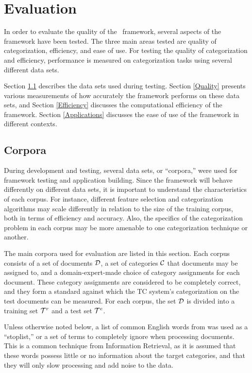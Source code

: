 \chapter{Evaluation}
\label{Evaluation}

In order to evaluate the quality of the \aicat\ framework, several
aspects of the framework have been tested.  The three main areas
tested are quality of categorization, efficiency, and ease of use.
For testing the quality of categorization and efficiency, performance
is measured on categorization tasks using several different data sets.

Section \ref{Corpora} describes the data sets used during testing.
Section \ref{Quality} presents various measurements of how accurately
the framework performs on these data sets, and Section
\ref{Efficiency} discusses the computational efficiency of the
framework.  Section \ref{Applications} discusses the ease of use of
the framework in different contexts.


\section{Corpora}
\label{Corpora}

During development and testing, several data sets, or ``corpora,''
were used for framework testing and application building.  Since the
framework will behave differently on different data sets, it is
important to understand the characteristics of each corpus.  For
instance, different feature selection and categorization algorithms
may scale differently in relation to the size of the training corpus,
both in terms of efficiency and accuracy.\cite{chakrabarti:98} Also,
the specifics of the categorization problem in each corpus may be more
amenable to one categorization technique or another.

The main corpora used for evaluation are listed in this section.  Each
corpus consists of a set of documents $\mathcal{D}$, a set of categories $\mathcal{C}$ that
documents may be assigned to, and a domain-expert-made choice of
category assignments for each document.  These category assignments
are considered to be completely correct, and they form a standard
against which the TC system's categorization on the test documents can
be measured.  For each corpus, the set $\mathcal{D}$ is divided into a
training set $\mathcal{T}^r$ and a test set $\mathcal{T}^e$.

Unless otherwise noted below, a list of common English words from
\cite{salton:89} was used as a ``stoplist,'' or a set of terms to
completely ignore when processing documents.  This is a common technique from
Information Retrieval,\cite{XXX-manning} as it is assumed that these words
possess little or no information about the target categories, and that
they will only slow processing and add noise to the data.


